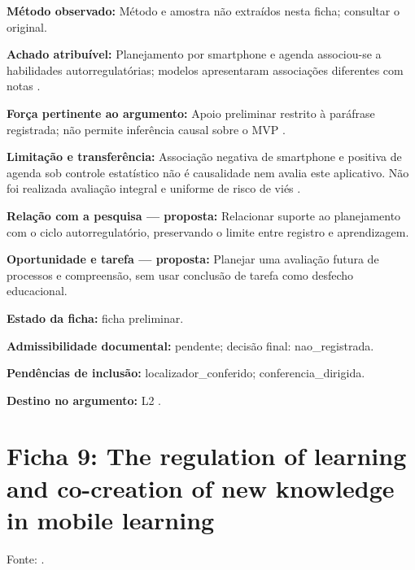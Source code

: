 \noindent\textbf{Método observado:} Método e amostra não extraídos nesta ficha; consultar o original.\par\medskip

\noindent\textbf{Achado atribuível:} Planejamento por smartphone e agenda associou-se a habilidades autorregulatórias; modelos apresentaram associações diferentes com notas \citep{education_hartley2022}.\par\medskip

\noindent\textbf{Força pertinente ao argumento:} Apoio preliminar restrito à paráfrase registrada; não permite inferência causal sobre o MVP \citep{education_hartley2022}.\par\medskip

\noindent\textbf{Limitação e transferência:} Associação negativa de smartphone e positiva de agenda sob controle estatístico não é causalidade nem avalia este aplicativo. Não foi realizada avaliação integral e uniforme de risco de viés \citep{education_hartley2022}.\par\medskip

\noindent\textbf{Relação com a pesquisa — proposta:} Relacionar suporte ao planejamento com o ciclo autorregulatório, preservando o limite entre registro e aprendizagem.\par\medskip

\noindent\textbf{Oportunidade e tarefa — proposta:} Planejar uma avaliação futura de processos e compreensão, sem usar conclusão de tarefa como desfecho educacional.\par\medskip

\noindent\textbf{Estado da ficha:} ficha preliminar.\par\medskip

\noindent\textbf{Admissibilidade documental:} pendente; decisão final: nao\_registrada.\par\medskip

\noindent\textbf{Pendências de inclusão:} localizador\_conferido; conferencia\_dirigida.\par\medskip

\noindent\textbf{Destino no argumento:} L2 .

\clearpage\section*{Ficha 9: The regulation of learning and co-creation of new knowledge in mobile learning}

Fonte: \citet{education_lim2019}.

